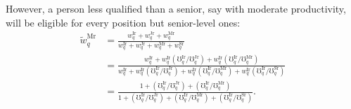 \documentclass[hidelinks, nonatbib]{elsarticle}
\begin{document}
\begin{enumerate}
    However, a person less qualified than a senior, say with moderate productivity, will be eligible for every position but senior-level ones:
    \begin{align}
        \tilde{w}_{q}^{\text{Mr}} 
        &= 
        \frac{
            w_{q}^{\text{Ir}} +
            w_{q}^{\text{Jr}} +
            w_{q}^{\text{Mr}}
        }{
            w_{q}^{\text{Ir}} +
            w_{q}^{\text{Jr}} +
            w_{q}^{\text{Mr}} +
            w_{q}^{\text{Sr}}
        }
        \\
        &= 
        \frac{
            w_{q}^{\text{Ir}} +
            w_{q}^{\text{Ir}} 
             (
                \mho_{q}^{\text{Ir}} / 
                \mho_{q}^{\text{Jr}}
            ) +
            w_{q}^{\text{Ir}} 
             (
                \mho_{q}^{\text{Ir}} / 
                \mho_{q}^{\text{Mr}}
            )
        }{
            w_{q}^{\text{Ir}} +
            w_{q}^{\text{Ir}} 
             (
                \mho_{q}^{\text{Ir}} / 
                \mho_{q}^{\text{Jr}}
            ) +
            w_{q}^{\text{Ir}} 
             (
                \mho_{q}^{\text{Ir}} / 
                \mho_{q}^{\text{Mr}}
            ) +
            w_{q}^{\text{Ir}} 
             (
                \mho_{q}^{\text{Ir}} / 
                \mho_{q}^{\text{Sr}}
            )
        }
        \\
        &= 
        \frac{
            1 +
            (
                \mho_{q}^{\text{Ir}} / 
                \mho_{q}^{\text{Jr}}
            ) +
            (
                \mho_{q}^{\text{Ir}} / 
                \mho_{q}^{\text{Mr}}
            )
        }{
            1 +
            (
                \mho_{q}^{\text{Ir}} / 
                \mho_{q}^{\text{Jr}}
            ) +
            (
                \mho_{q}^{\text{Ir}} / 
                \mho_{q}^{\text{Mr}}
            ) +
            (
                \mho_{q}^{\text{Ir}} / 
                \mho_{q}^{\text{Sr}}
            )
        }
        .
    \end{align}
    

\end{enumerate}
\end{document}

